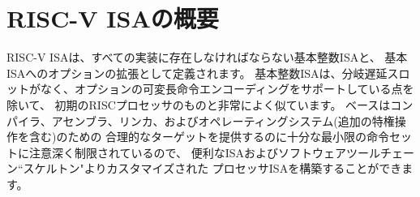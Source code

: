 \begin{comment}
\section{RISC-V ISA Overview}

A RISC-V ISA is defined as a base integer ISA, which must be present
in any implementation, plus optional extensions to the base ISA.  The
base integer ISAs are very similar to that of the early RISC processors
except with no branch delay slots and with support for optional
variable-length instruction encodings.  A base is carefully
restricted to a minimal set of instructions sufficient to provide a
reasonable target for compilers, assemblers, linkers, and operating
systems (with additional privileged operations), and so provides
a convenient ISA and software toolchain ``skeleton'' around which more
customized processor ISAs can be built.

Although it is convenient to speak of {\em the} RISC-V ISA, RISC-V is
actually a family of related ISAs, of which there are currently four
base ISAs.  Each base integer instruction set is characterized by the
width of the integer registers and the corresponding size of the
address space and by the number of integer registers.  There are two
primary base integer variants, RV32I and RV64I, described in
Chapters~\ref{rv32} and \ref{rv64}, which provide 32-bit or 64-bit
address spaces respectively.  We use the term XLEN to refer to the
width of an integer register in bits (either 32 or 64).
Chapter~\ref{rv32e} describes the RV32E subset variant of the RV32I
base instruction set, which has been added to support small
microcontrollers, and which has half the number of integer registers.
Chapter~\ref{rv128} sketches a future RV128I variant of the base
integer instruction set supporting a flat 128-bit address space
(XLEN=128).  The base integer instruction sets use a two's-complement
representation for signed integer values.
\end{comment}

\section{RISC-V ISAの概要}

RISC-V ISAは、すべての実装に存在しなければならない基本整数ISAと、
基本ISAへのオプションの拡張として定義されます。
基本整数ISAは、分岐遅延スロットがなく、オプションの可変長命令エンコーディングをサポートしている点を除いて、
初期のRISCプロセッサのものと非常によく似ています。
ベースはコンパイラ、アセンブラ、リンカ、およびオペレーティングシステム(追加の特権操作を含む)のための
合理的なターゲットを提供するのに十分な最小限の命令セットに注意深く制限されているので、
便利なISAおよびソフトウェアツールチェーン``スケルトン"よりカスタマイズされた
プロセッサISAを構築することができます。

